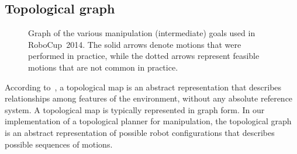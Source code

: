 \subsection{Topological graph}\label{wbp:ssec:graph}
\begin{figure}[ht]
    \centering
    \def\svgwidth{0.75\linewidth}
    
    \caption{Graph of the various manipulation (intermediate) goals used in RoboCup~2014. The solid arrows denote motions that were performed in practice, while the dotted arrows represent feasible motions that are not common in practice.}
    \label{wbp:fig:graph}
\end{figure}
According to~\cite{Zavlangas2002}, a topological map is an abstract representation that describes relationships among features of the environment, without any absolute reference system. A topological map is typically represented in graph form. In our implementation of a topological planner for manipulation,
the topological graph is an abstract representation of possible robot configurations that describes possible sequences of motions. 

